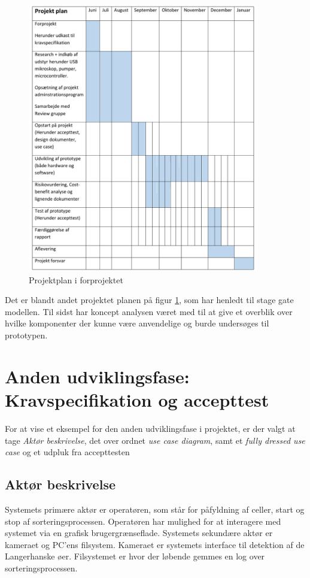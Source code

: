 \begin{figure}[H]
	\centering
	\includegraphics[width=0.9\textwidth]{billeder/Hovedrapport/forprojektplan.pdf}
	\caption{Projektplan i forprojektet}
	\label{fig:forprojekt}
\end{figure}
Det er blandt andet projektet planen på figur \ref{fig:forprojekt}, som har henledt til stage gate modellen. Til sidst har koncept analysen været med til at give et overblik over hvilke komponenter der kunne være anvendelige og burde undersøges til prototypen.
 
\section{Anden udviklingsfase: Kravspecifikation og accepttest}
\label{subsec:krav}
For at vise et eksempel for den anden udviklingsfase i projektet, er der valgt at tage \textit{Aktør beskrivelse}, det over ordnet \textit{use case diagram}, samt et \textit{fully dressed use case} og et udpluk fra accepttesten


\subsection{Aktør beskrivelse}
Systemets primære aktør er operatøren, som står for påfyldning af celler, start og stop af sorteringsprocessen. Operatøren har mulighed for at interagere med systemet via en grafisk brugergrænseflade. Systemets sekundære aktør er kameraet og PC’ens filsystem. Kameraet er systemets interface til detektion af de Langerhanske øer. Filsystemet er hvor der løbende gemmes en log over sorteringsprocessen.


